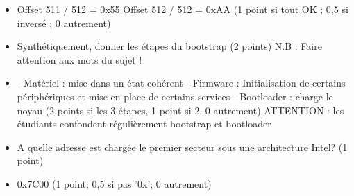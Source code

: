 \begin{correction}

\begin{itemize}
  \item Offset 511 / 512 = 0x55
  \newline Offset 512 / 512 = 0xAA
  \newline (1 point si tout OK ; 0,5 si invers\'e ; 0 autrement)
\end{itemize}

\end{correction}

\begin{itemize}
  \item Synth\'etiquement, donner les \'etapes du bootstrap (2 points)
  \newline N.B : Faire attention aux mots du sujet !
\end{itemize}

\begin{correction}

\begin{itemize}
  \item - Mat\'eriel : mise dans un \'etat coh\'erent
  \newline - Firmware : Initialisation de certains p\'eriph\'eriques et mise en place de certains services
  \newline - Bootloader : charge le noyau
  \newline (2 points si les 3 \'etapes, 1 point si 2, 0 autrement)
  \newline ATTENTION : les \'etudiants confondent r\'eguli\`erement bootstrap et bootloader
\end{itemize}

\end{correction}

\begin{itemize}
  \item A quelle adresse est charg\'ee le premier secteur sous une architecture Intel? (1 point)
\end{itemize}

\begin{correction}

\begin{itemize}
  \item 0x7C00 (1 point; 0,5 si pas '0x'; 0 autrement)
\end{itemize}

\end{correction}

